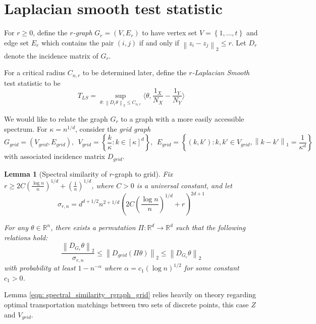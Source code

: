 \documentclass{article}
\newcommand{\Reals}{\mathbb{R}}
\newcommand{\norm}[1]{\left\lVert#1\right\rVert}
\newcommand{\set}[1]{\left\{#1\right\}}
\newcommand{\dotp}[2]{\langle #1, #2 \rangle}
\newcommand{\1}{\mathbb{I}}
\newcommand{\Z}{Z} %
\theoremstyle{alden}
\theoremstyle{aldenthm}
\newtheorem{lemma}{Lemma}
\theoremstyle{definition}
\theoremstyle{remark}
\begin{document}
\section{Laplacian smooth test statistic}

For $r \geq 0$, define the \emph{$r$-graph} $G_r = (V,E_r)$ to have vertex set $V = \set{1,\ldots,t}$ and edge set $E_r$ which contains the pair $(i,j)$ if and only if $\norm{z_i - z_j}_2 \leq r$. Let $D_{r}$ denote the incidence matrix of $G_r$.

For a critical radius $C_{n,r}$ to be determined later, define the \emph{$r$-Laplacian Smooth} test statistic to be
\begin{equation*}
T_{LS} = \sup_{\theta: \norm{D_{r}\theta}_2 \leq C_{n,r}} \dotp{\theta}{\frac{1_X}{N_X} - \frac{1_Y}{N_Y}}
\end{equation*}

We would like to relate the graph $G_r$ to a graph with a more easily accessible spectrum. For $\kappa = n^{1/d}$, consider the \emph{grid graph}
\begin{equation*}
G_{grid} = (V_{grid},E_{grid}),~~ V_{grid} = \set{\frac{k}{\kappa}: k \in [\kappa]^d},~~ E_{grid} = \set{(k,k'): k, k' \in V_{grid}, \norm{k - k'}_1 = \frac{1}{\kappa^d}}
\end{equation*}
with associated incidence matrix $D_{grid}$.

\begin{lemma}[Spectral similarity of $r$-graph to grid]
	\label{lem: spectral_similarity_rgraph_grid}
	Fix $r \geq 2 C\left(\frac{\log n}{n}\right)^{1/d} + \left(\frac{1}{n}\right)^{1/d}$, where $C > 0$ is a universal constant, and let 
	\begin{equation*}
	\sigma_{r,n} =  d^{d + 1/2} n^{2 + 1/d} \left(2C\left(\frac{\log n}{n}\right)^{1/d} + r \right)^{2d + 1}
	\end{equation*}
	
	For any $\theta \in \Reals^n$, there exists a permutation $\Pi: \Reals^d \to \Reals^d$ such that the following relations hold:
	\begin{equation}
	\label{eqn: spectral_similarity_rgraph_grid}
	\frac{\norm{D_{G_r}\theta}_2}{\sigma_{r,n}} \leq \norm{D_{grid} (\Pi \theta)}_2 \leq \norm{D_{G_r}\theta}_2
	\end{equation}
	with probability at least $1 - n^{-\alpha}$ where $\alpha = c_1 (\log n)^{1/2}$ for some constant $c_1 > 0$.
\end{lemma}

Lemma \ref{eqn: spectral_similarity_rgraph_grid} relies heavily on theory regarding optimal transportation matchings between two sets of discrete points, this case $\Z$ and $V_{grid}$.
\end{document}
